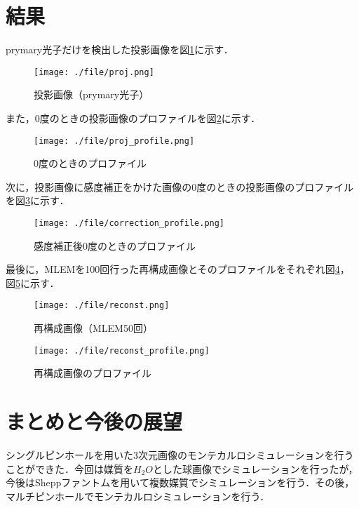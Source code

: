 \documentclass[dvipdfmx,autodetect-engine,twocolumn,10pt]{jsarticle}%
\begin{document}
\newpage
\section{結果}

prymary光子だけを検出した投影画像を図\ref{proj_img}に示す．
\begin{figure}[htbp]
  \begin{center}
    \texttt{[image: ./file/proj.png]}
    \caption{投影画像（prymary光子）}
    \label{proj_img}
  \end{center}
\end{figure}

また，0度のときの投影画像のプロファイルを図\ref{proj_profile}に示す．
\begin{figure}[htbp]
  \begin{center}
    \texttt{[image: ./file/proj\_profile.png]}
    \caption{0度のときのプロファイル}
    \label{proj_profile}
  \end{center}
\end{figure}

次に，投影画像に感度補正をかけた画像の0度のときの投影画像のプロファイルを図\ref{correction_profile}に示す．
\begin{figure}[htbp]
  \begin{center}
    \texttt{[image: ./file/correction\_profile.png]}
    \caption{感度補正後0度のときのプロファイル}
    \label{correction_profile}
  \end{center}
\end{figure}

最後に，MLEMを100回行った再構成画像とそのプロファイルをそれぞれ図\ref{reconst}，図\ref{reconst_profile}に示す．
\begin{figure}[htbp]
  \begin{center}
    \texttt{[image: ./file/reconst.png]}
    \caption{再構成画像（MLEM50回）}
    \label{reconst}
  \end{center}
\end{figure}

\begin{figure}[htbp]
  \begin{center}
    \texttt{[image: ./file/reconst\_profile.png]}
    \caption{再構成画像のプロファイル}
    \label{reconst_profile}
  \end{center}
\end{figure}

\section{まとめと今後の展望}
シングルピンホールを用いた3次元画像のモンテカルロシミュレーションを行うことができた．今回は媒質を$H_2O$とした球画像でシミュレーションを行ったが，今後はSheppファントムを用いて複数媒質でシミュレーションを行う．その後，マルチピンホールでモンテカルロシミュレーションを行う．
\end{document}
